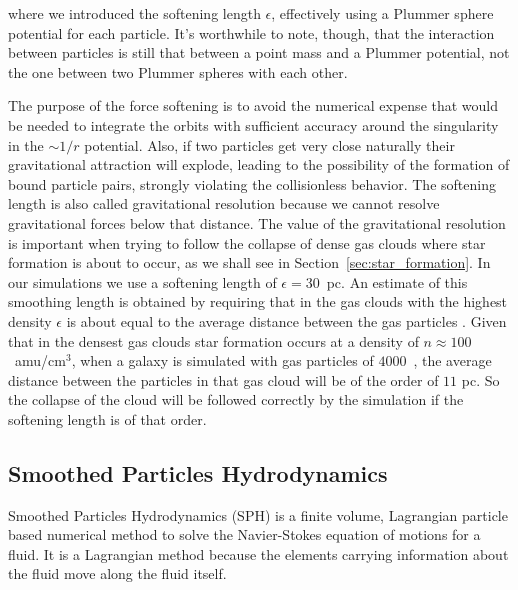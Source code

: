 where we introduced the softening length $\epsilon$, effectively using a Plummer sphere potential for each particle. It's worthwhile to note, though, that the interaction between particles is still that between a point mass and a Plummer potential, not the one between two Plummer spheres with each other.

The purpose of the force softening is to avoid the numerical expense that would be needed to integrate the orbits with sufficient accuracy around the singularity in the $\sim 1/r$ potential.
Also, if two particles get very close naturally their gravitational attraction will explode, leading to the possibility of the formation of bound particle pairs, strongly violating the collisionless behavior.
The softening length is also called gravitational resolution because we cannot resolve gravitational forces below that distance.
The value of the gravitational resolution is important when trying to follow the collapse of dense gas clouds where star formation is about to occur, as we shall see in Section~\ref{sec:star_formation}.
In our simulations we use a softening length of $\epsilon=30$~pc.
An estimate of this smoothing length is obtained by requiring that in the gas clouds with the highest density $\epsilon$ is about equal to the average distance between the gas particles \citep{Schroyen2013}. %
Given that in the densest gas clouds star formation occurs at a density of $n\approx100$~amu/cm$^{3}$, when a galaxy is simulated with gas particles of $4000$~\Msun{}, the average distance between the particles in that gas cloud will be of the order of $11$ pc.
So the collapse of the cloud will be followed correctly by the simulation if the softening length is of that order. %

\subsection{Smoothed Particles Hydrodynamics}
Smoothed Particles Hydrodynamics (SPH) is a finite volume, Lagrangian particle based numerical method to solve the Navier-Stokes equation of motions for a fluid.
It is a Lagrangian method because the elements carrying information about the fluid move along the fluid itself.

